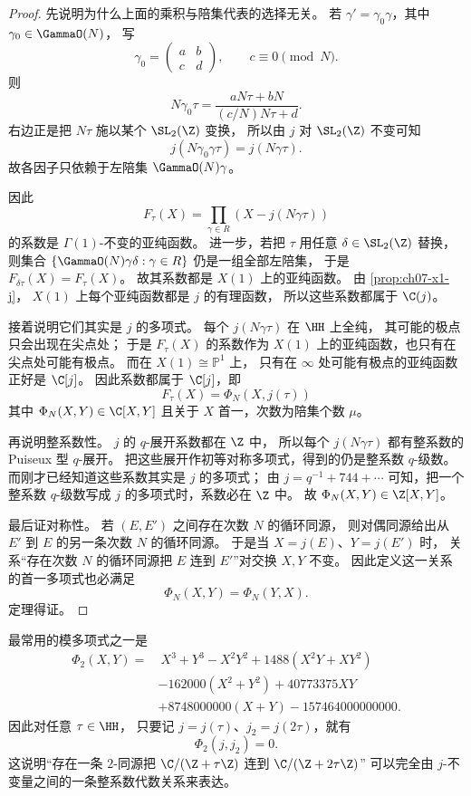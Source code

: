 \begin{proof}
先说明为什么上面的乘积与陪集代表的选择无关。
若 $\gamma' = \gamma_0\gamma$，其中 $\gamma_0\in\GammaO(N)$，
写
\[
  \gamma_0=\begin{pmatrix} a&b\\ c&d\end{pmatrix},
  \qquad c\equiv 0\pmod N.
\]
则
\[
  N\gamma_0\tau=\frac{aN\tau+bN}{(c/N)N\tau+d}.
\]
右边正是把 $N\tau$ 施以某个 $\SL_2(\Z)$ 变换，
所以由 $j$ 对 $\SL_2(\Z)$ 不变可知
\[
  j(N\gamma_0\gamma\tau)=j(N\gamma\tau).
\]
故各因子只依赖于左陪集 $\GammaO(N)\gamma$。

因此
\[
  F_\tau(X)=\prod_{\gamma\in R}(X-j(N\gamma\tau))
\]
的系数是 $\Gamma(1)$-不变的亚纯函数。
进一步，若把 $\tau$ 用任意 $\delta\in\SL_2(\Z)$ 替换，
则集合 $\{\GammaO(N)\gamma\delta:\gamma\in R\}$ 仍是一组全部左陪集，
于是 $F_{\delta\tau}(X)=F_\tau(X)$。
故其系数都是 $X(1)$ 上的亚纯函数。
由 \cref{prop:ch07-x1-j}，
$X(1)$ 上每个亚纯函数都是 $j$ 的有理函数，
所以这些系数都属于 $\C(j)$。

接着说明它们其实是 $j$ 的多项式。
每个 $j(N\gamma\tau)$ 在 $\HH$ 上全纯，
其可能的极点只会出现在尖点处；
于是 $F_\tau(X)$ 的系数作为 $X(1)$ 上的亚纯函数，也只有在尖点处可能有极点。
而在 $X(1)\cong \mathbb P^1$ 上，
只有在 $\infty$ 处可能有极点的亚纯函数正好是 $\C[j]$。
因此系数都属于 $\C[j]$，即
\[
  F_\tau(X)=\Phi_N(X,j(\tau))
\]
其中 $\Phi_N(X,Y)\in \C[X,Y]$ 且关于 $X$ 首一，次数为陪集个数 $\mu$。

再说明整系数性。
$j$ 的 $q$-展开系数都在 $\Z$ 中，
所以每个 $j(N\gamma\tau)$ 都有整系数的 Puiseux 型 $q$-展开。
把这些展开作初等对称多项式，得到的仍是整系数 $q$-级数。
而刚才已经知道这些系数其实是 $j$ 的多项式；
由 $j=q^{-1}+744+\cdots$ 可知，把一个整系数 $q$-级数写成 $j$ 的多项式时，系数必在 $\Z$ 中。
故 $\Phi_N(X,Y)\in \Z[X,Y]$。

最后证对称性。
若 $(E,E')$ 之间存在次数 $N$ 的循环同源，
则对偶同源给出从 $E'$ 到 $E$ 的另一条次数 $N$ 的循环同源。
于是当 $X=j(E)$、$Y=j(E')$ 时，
关系“存在次数 $N$ 的循环同源把 $E$ 连到 $E'$”对交换 $X,Y$ 不变。
因此定义这一关系的首一多项式也必满足
\[
  \Phi_N(X,Y)=\Phi_N(Y,X).
\]
定理得证。
\end{proof}

\begin{example}
\label{ex:ch07-phi2}
最常用的模多项式之一是
\[
\begin{aligned}
\Phi_2(X,Y)=&\ X^3+Y^3-X^2Y^2+1488(X^2Y+XY^2)\\
&-162000(X^2+Y^2)+40773375XY\\
&+8748000000(X+Y)-157464000000000.
\end{aligned}
\]
因此对任意 $\tau\in\HH$，
只要记 $j=j(\tau)$、$j_2=j(2\tau)$，就有
\[
  \Phi_2(j,j_2)=0.
\]
这说明“存在一条 $2$-同源把 $\C/(\Z+\tau\Z)$ 连到 $\C/(\Z+2\tau\Z)$”
可以完全由 $j$-不变量之间的一条整系数代数关系来表达。
\end{example}

